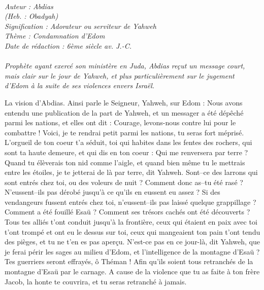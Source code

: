 \BFont
\noindent\hrulefill
{\footnotesize
\textit{
\bigskip
{\centering{}
\\Auteur : Abdias
\\(Heb. : Obadyah)
\\Signification : Adorateur ou serviteur de Yahweh
\\Thème : Condamnation d'Edom
\\Date de rédaction : 6ème siècle av. J.-C.\\}
}
\textit{
\\Prophète ayant exercé son ministère en Juda, Abdias reçut un message court, mais clair sur le jour de Yahweh, et plus particulièrement sur le jugement d'Edom à la suite de ses violences envers Israël.\bigskip
}
}
\par\nobreak\noindent\hrulefill
\begin{multicols}{2}
\VerseOne{}La vision d'Abdias. Ainsi parle le Seigneur, Yahweh, sur Edom : Nous avons entendu une publication de la part de Yahweh, et un messager a été dépêché parmi les nations, et elles ont dit : Courage, levons-nous contre lui pour le combattre !
Voici, je te rendrai petit parmi les nations, tu seras fort méprisé.
L'orgueil de ton coeur t'a séduit, toi qui habites dans les fentes des rochers, qui sont ta haute demeure, et qui dis en ton coeur : Qui me renversera par terre ?
Quand tu élèverais ton nid comme l'aigle, et quand bien même tu le mettrais entre les étoiles, je te jetterai de là par terre, dit Yahweh.
Sont–ce des larrons qui sont entrés chez toi, ou des voleurs de nuit ? Comment donc as–tu été rasé ? N'eussent–ils pas dérobé jusqu'à ce qu'ils en eussent eu assez ? Si des vendangeurs fussent entrés chez toi, n'eussent–ils pas laissé quelque grappillage ?
Comment a été fouillé Esaü ? Comment ses trésors cachés ont été découverts ?
Tous tes alliés t'ont conduit jusqu'à la frontière, ceux qui étaient en paix avec toi t'ont trompé et ont eu le dessus sur toi, ceux qui mangeaient ton pain t'ont tendu des pièges, et tu ne t'en es pas aperçu.
N'est-ce pas en ce jour-là, dit Yahweh, que je ferai périr les sages au milieu d'Edom, et l'intelligence de la montagne d'Esaü ?
Tes guerriers seront effrayés, ô Théman ! Afin qu'ils soient tous retranchés de la montagne d'Esaü par le carnage.
A cause de la violence que tu as faite à ton frère Jacob, la honte te couvrira, et tu seras retranché à jamais.

\end{multicols}
